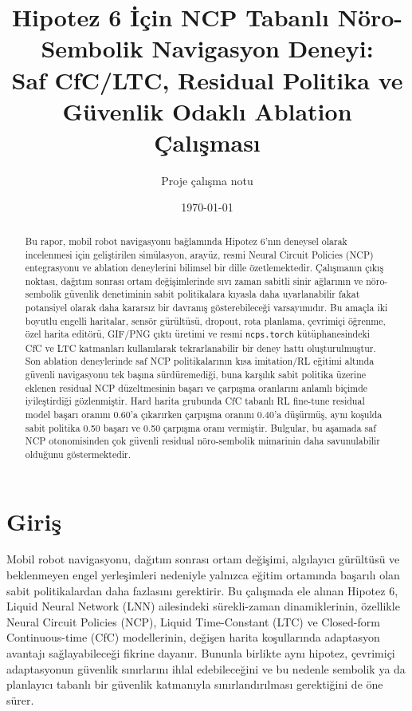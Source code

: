\documentclass[11pt,a4paper]{article}
\title{\textbf{Hipotez 6 İçin NCP Tabanlı Nöro-Sembolik Navigasyon Deneyi: \\
Saf CfC/LTC, Residual Politika ve Güvenlik Odaklı Ablation Çalışması}}
\author{Proje çalışma notu}
\date{\today}
\begin{document}
\maketitle

\begin{abstract}
Bu rapor, mobil robot navigasyonu bağlamında Hipotez 6'nın deneysel olarak incelenmesi için geliştirilen simülasyon, arayüz, resmi Neural Circuit Policies (NCP) entegrasyonu ve ablation deneylerini bilimsel bir dille özetlemektedir. Çalışmanın çıkış noktası, dağıtım sonrası ortam değişimlerinde sıvı zaman sabitli sinir ağlarının ve nöro-sembolik güvenlik denetiminin sabit politikalara kıyasla daha uyarlanabilir fakat potansiyel olarak daha kararsız bir davranış gösterebileceği varsayımıdır. Bu amaçla iki boyutlu engelli haritalar, sensör gürültüsü, dropout, rota planlama, çevrimiçi öğrenme, özel harita editörü, GIF/PNG çıktı üretimi ve resmi \texttt{ncps.torch} kütüphanesindeki CfC ve LTC katmanları kullanılarak tekrarlanabilir bir deney hattı oluşturulmuştur. Son ablation deneylerinde saf NCP politikalarının kısa imitation/RL eğitimi altında güvenli navigasyonu tek başına sürdüremediği, buna karşılık sabit politika üzerine eklenen residual NCP düzeltmesinin başarı ve çarpışma oranlarını anlamlı biçimde iyileştirdiği gözlenmiştir. Hard harita grubunda CfC tabanlı RL fine-tune residual model başarı oranını \num{0.60}'a çıkarırken çarpışma oranını \num{0.40}'a düşürmüş, aynı koşulda sabit politika \num{0.50} başarı ve \num{0.50} çarpışma oranı vermiştir. Bulgular, bu aşamada saf NCP otonomisinden çok güvenli residual nöro-sembolik mimarinin daha savunulabilir olduğunu göstermektedir.
\end{abstract}

\section{Giriş}

Mobil robot navigasyonu, dağıtım sonrası ortam değişimi, algılayıcı gürültüsü ve beklenmeyen engel yerleşimleri nedeniyle yalnızca eğitim ortamında başarılı olan sabit politikalardan daha fazlasını gerektirir. Bu çalışmada ele alınan Hipotez 6, Liquid Neural Network (LNN) ailesindeki sürekli-zaman dinamiklerinin, özellikle Neural Circuit Policies (NCP), Liquid Time-Constant (LTC) ve Closed-form Continuous-time (CfC) modellerinin, değişen harita koşullarında adaptasyon avantajı sağlayabileceği fikrine dayanır. Bununla birlikte aynı hipotez, çevrimiçi adaptasyonun güvenlik sınırlarını ihlal edebileceğini ve bu nedenle sembolik ya da planlayıcı tabanlı bir güvenlik katmanıyla sınırlandırılması gerektiğini de öne sürer.
\end{document}
